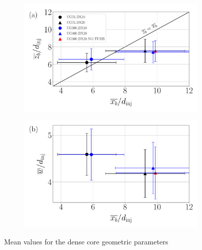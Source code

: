 \begin{figure}[ht]
\flushleft
\begin{subfigure}[b]{0.45\textwidth}
	\centering
   \includegraphics[scale=0.25]{./part2_developments/figures_ch5_resolved_JICF/results_dense_core_modeling/map_xb_zb}
   \label{fig:dense_core_mean_parameters_scatterplots_zb_xb}
\end{subfigure}
\hspace{0.25in}
\begin{subfigure}[b]{0.45\textwidth}
	\centering
   \includegraphics[scale=0.25]{./part2_developments/figures_ch5_resolved_JICF/results_dense_core_modeling/map_xb_width}
   \label{fig:dense_core_mean_parameters_scatterplots_w_xb}
\end{subfigure}
\caption{Mean values for the dense core geometric parameters}
\label{fig:dense_core_mean_parameters_scatterplots}
\end{figure}

%

